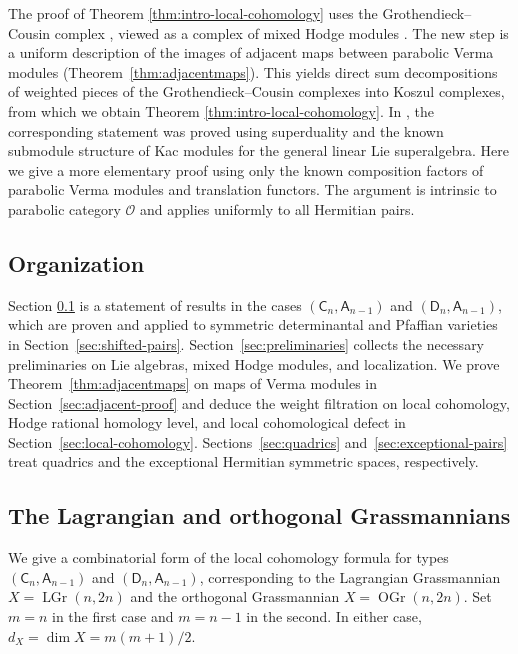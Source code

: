 \documentclass[12pt]{amsart}
\theoremstyle{definition}
\numberwithin{equation}{section}
\begin{document}
The proof of Theorem \ref{thm:intro-local-cohomology} uses the Grothendieck--Cousin complex \cite{kempf}, viewed as a
complex of mixed Hodge modules \cite{schubertLC}.
The new step is a uniform description of the images of adjacent
maps between parabolic Verma modules
(Theorem~\ref{thm:adjacentmaps}). This yields direct sum decompositions of weighted pieces of the Grothendieck--Cousin complexes
into Koszul complexes, from which we obtain Theorem \ref{thm:intro-local-cohomology}. In \cite{schubertLC}, the corresponding statement was proved using superduality and the known submodule structure of Kac modules for the general linear Lie superalgebra. Here we give a more elementary proof using only the known composition factors of parabolic Verma modules and translation functors. The argument is intrinsic to parabolic category $\mathcal O$ and applies uniformly to all Hermitian pairs.

\subsection*{Organization}  Section \ref{sec:shifted-shapes} is a statement of results in the cases $(\mathsf C_n,\mathsf A_{n-1})$ and
$(\mathsf D_n,\mathsf A_{n-1})$, which are proven and applied to symmetric determinantal and Pfaffian varieties in Section~\ref{sec:shifted-pairs}.  Section~\ref{sec:preliminaries} collects the necessary preliminaries on Lie algebras, mixed Hodge modules, and localization. We prove Theorem~\ref{thm:adjacentmaps} on maps of Verma modules in Section~\ref{sec:adjacent-proof} and deduce the weight filtration on local cohomology, Hodge rational homology level, and local cohomological defect in Section~\ref{sec:local-cohomology}. Sections~\ref{sec:quadrics} and~\ref{sec:exceptional-pairs} treat quadrics and the exceptional Hermitian symmetric spaces, respectively.


\subsection{The Lagrangian and orthogonal Grassmannians}\label{sec:shifted-shapes}

We give a combinatorial form of the local cohomology
formula for types $(\mathsf C_n,\mathsf A_{n-1})$ and
$(\mathsf D_n,\mathsf A_{n-1})$, corresponding to the Lagrangian Grassmannian
$X=\operatorname{LGr}(n,2n)$ and the orthogonal Grassmannian $X=\operatorname{OGr}(n,2n)$. Set $m=n$ in the first case and $m=n-1$ in the second.
In either case, $d_X=\dim X=m(m+1)/2$. 
\end{document}
